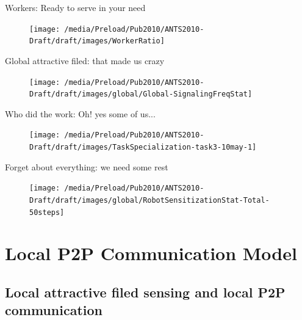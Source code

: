\documentclass{beamer}
\begin{document}
\begin{frame}[t]{Workers: \alert{Ready to serve in your need}}
\begin{figure}
\centering
\texttt{[image: /media/Preload/Pub2010/ANTS2010-Draft/draft/images/WorkerRatio]}
\label{fig:setup} %
\end{figure}
\end{frame}
%
\begin{frame}[t]{Global attractive filed: \alert{that made us crazy}}
\begin{figure}
\centering
\texttt{[image: /media/Preload/Pub2010/ANTS2010-Draft/draft/images/global/Global-SignalingFreqStat]}
\label{fig:setup} %
\end{figure}
\end{frame}
\begin{frame}[t]{Who did the work: \alert{Oh! yes some of us...}}
\begin{figure}
\centering
\texttt{[image: /media/Preload/Pub2010/ANTS2010-Draft/draft/images/TaskSpecialization-task3-10may-1]}
\label{fig:setup} %
\end{figure}
\end{frame}
\begin{frame}[t]{Forget about everything: \alert{we need some rest}}
\begin{figure}
\centering
\texttt{[image: /media/Preload/Pub2010/ANTS2010-Draft/draft/images/global/RobotSensitizationStat-Total-50steps]}
\label{fig:setup} %
\end{figure}
\end{frame}
\section{Local P2P Communication Model}
\subsection{Local  attractive filed sensing and local P2P communication }
\end{document}

